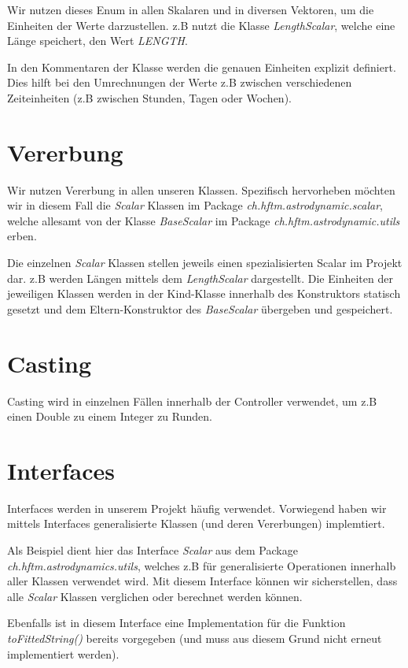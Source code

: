 Wir nutzen dieses Enum in allen Skalaren und in diversen Vektoren, um die Einheiten der Werte darzustellen. z.B nutzt die Klasse \textit{LengthScalar}, welche eine Länge speichert, den Wert \textit{LENGTH}.

In den Kommentaren der Klasse werden die genauen Einheiten explizit definiert. Dies hilft bei den Umrechnungen der Werte z.B zwischen verschiedenen Zeiteinheiten (z.B zwischen Stunden, Tagen oder Wochen).

\section{Vererbung}

Wir nutzen Vererbung in allen unseren Klassen. Spezifisch hervorheben möchten wir in diesem Fall die \textit{Scalar} Klassen im Package \textit{ch.hftm.astrodynamic.scalar}, welche allesamt von der Klasse \textit{BaseScalar} im Package \textit{ch.hftm.astrodynamic.utils} erben.

Die einzelnen \textit{Scalar} Klassen stellen jeweils einen spezialisierten Scalar im Projekt dar. z.B werden Längen mittels dem \textit{LengthScalar} dargestellt.
Die Einheiten der jeweiligen Klassen werden in der Kind-Klasse innerhalb des Konstruktors statisch gesetzt und dem Eltern-Konstruktor des \textit{BaseScalar} übergeben und gespeichert.

\section{Casting}

Casting wird in einzelnen Fällen innerhalb der Controller verwendet, um z.B einen Double zu einem Integer zu Runden.

\section{Interfaces}

Interfaces werden in unserem Projekt häufig verwendet. Vorwiegend haben wir mittels Interfaces generalisierte Klassen (und deren Vererbungen) implemtiert.

Als Beispiel dient hier das Interface \textit{Scalar} aus dem Package \textit{ch.hftm.astrodynamics.utils}, welches z.B für generalisierte Operationen innerhalb aller Klassen verwendet wird. Mit diesem Interface können wir sicherstellen, dass alle \textit{Scalar} Klassen verglichen oder berechnet werden können.

Ebenfalls ist in diesem Interface eine Implementation für die Funktion \textit{toFittedString()} bereits vorgegeben (und muss aus diesem Grund nicht erneut implementiert werden).


